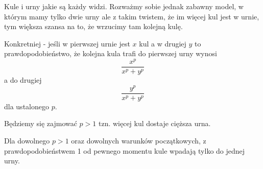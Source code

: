 Kule i urny jakie są każdy widzi. Rozważmy sobie jednak zabawny model, w którym mamy tylko dwie urny ale z takim twistem, że im więcej kul jest w urnie, tym większa szansa na to, że wrzucimy tam kolejną kulę.

Konkretniej - jeśli w pierwszej urnie jest \( x \) kul a w drugiej \( y \) to prawdopodobieństwo, że kolejna kula trafi do pierwszej urny wynosi \[ \frac{x^p}{x^p + y^p} \] a do drugiej \[ \frac{y^p}{x^p + y^p} \] 
dla ustalonego \( p \).

Będziemy się zajmować \( p > 1 \) tzn. więcej kul dostaje cięższa urna.

\begin{theorem}
    Dla dowolnego \( p > 1 \) oraz dowolnych warunków początkowych, z prawdopodobieństwem 1 od pewnego momentu kule wpadają tylko do jednej urny.
\end{theorem}
